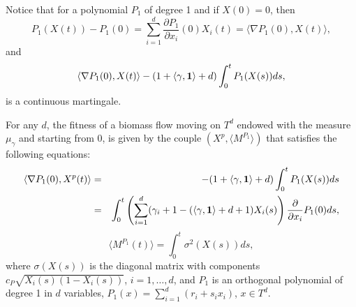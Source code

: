 \documentclass[12pt]{article}
\begin{document}
Notice that for a polynomial $P_1$ of degree 1 and if $X(0)=0$, then
\[P_1(X(t))-P_1(0)=\sum_{i=1}^d\frac{\partial P_1}{\partial x_i}(0)X_i(t)=\langle \nabla P_1(0),X(t)\rangle,\]
and 
\[\langle \nabla P_1(0),X(t)\rangle-(1+\langle \gamma,\mathbf{1}\rangle+d)\int_0^t  P_1(X(s))ds,\]
is a continuous martingale.
\begin{cor}
 For any $d$, the fitness of a biomass flow moving on $T^d$ endowed with the measure $\mu_\gamma$ and starting from 0, is given by the couple $(X^p,\langle M^{P_1}\rangle)$ that satisfies the following equations:
 \begin{eqnarray}
    \langle \nabla P_1(0),X^p(t)\rangle&=&-(1+\langle \gamma,\mathbf{1}\rangle+d)\int_0^tP_1(X(s))ds\\
    &=&\int_0^t\left(\sum_{i=1}^d
(\gamma_i+1-(\langle \gamma,\mathbf{1}\rangle+d+1)X_i(s)\right)\frac{\partial}{\partial x_i}P_1(0)ds,\nonumber\end{eqnarray}
\begin{equation}
    \langle M^{P_1}(t)\rangle=\int_0^t\sigma^2(X(s))ds,
    \end{equation}
where $\sigma (X(s))$ is the diagonal matrix with components $c_P\sqrt{X_i(s)(1-X_i(s))}$, $i=1,\ldots,d$, and $P_1$ is an orthogonal polynomial of degree 1 in $d$ variables, $P_1(x)=\sum_{i=1}^d(r_i+s_ix_i)$, $x\in T^d$.
\end{cor}
\end{document}
